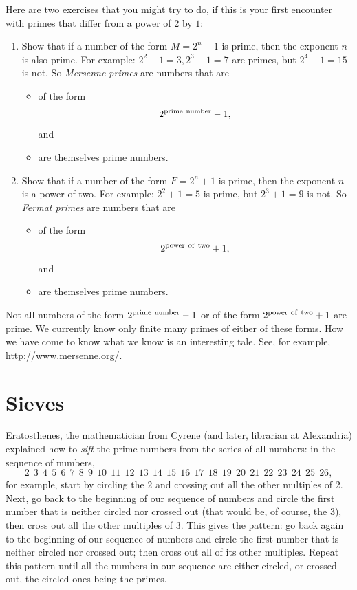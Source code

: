 \documentclass[openany]{book}
\newcommand{\ill}[3]{%
   \begin{figure}[H]%
   \vspace{-2ex}
   \centering%
   \texttt{[image: illustrations/\#1]}%
   \caption{#3}%
   \vspace{-2ex}
    \end{figure}}
\theoremstyle{plain}
\theoremstyle{definition}
\begin{document}
Here are two exercises that you might try to do, if this is your first
encounter with primes that differ from a power of $2$ by $1$:
  
\begin{enumerate}
\item Show that if a number of the form $M=2^n-1$ is prime, then the
  exponent $n$ is also prime.  For example: $ 2^2-1= 3, 2^3-1= 7$ are
  primes, but $2^4-1=15$ is not.  So {\it Mersenne primes} are numbers
  that are
  \begin{itemize}
    \item of the form $$2^{\rm prime\ number} -1,$$ and 
    \item are themselves prime numbers.
  \end{itemize}

\item Show that if a number of the form $F=2^n+1$ is prime, then the
  exponent $n$ is a power of two.  For example: $ 2^2+1= 5$ is prime,
  but $2^3+1= 9$ is not.  So {\it Fermat primes} are numbers that
  are 
  \begin{itemize} 
     \item of the form $$2^{\rm power\ of\ two} +1,$$ and 
     \item are themselves prime numbers.
  \end{itemize}
\end{enumerate}
  
Not all numbers of the form $2^{\rm prime\ number} -1$ or of the form
$2^{\rm power\ of\ two} +1$ are prime. We currently know only finite
many primes of either of these forms. How we have come to know what we
know is an interesting tale.  See, for example, \url{http://www.mersenne.org/}.


\chapter{Sieves}\label{ch:sieves}

Eratosthenes, the mathematician from Cyrene (and later, librarian at
Alexandria) explained how to {\em sift} the prime numbers from the
series of all numbers: in the sequence of numbers,
$$2\ \ 3\ \ 4 \ \ 5\ \ 6\ \ 7\ \ 8\ \ 9\ \ 10\ \ 11
\ \ 12\ \ 13\ \ 14\ \ 15\ \ 16\ \ 17\ \ 18\ \ 19\ \ 20\ \ 21\ \ 22\ \ 23\ \ 24\ \ 25\ \ 26,$$
for example, start by circling the $2$ and crossing out all the other
multiples of $2$.  Next, go back to the beginning of our sequence of
numbers and circle the first number that is neither circled nor
crossed out (that would be, of course, the $3$), then cross out all
the other multiples of $3$.  This gives the pattern: go back again to
the beginning of our sequence of numbers and circle the first number
that is neither circled nor crossed out; then cross out all of its
other multiples.  Repeat this pattern until all the numbers in our
sequence are either circled, or crossed out, the circled ones being
the primes.
\end{document}
